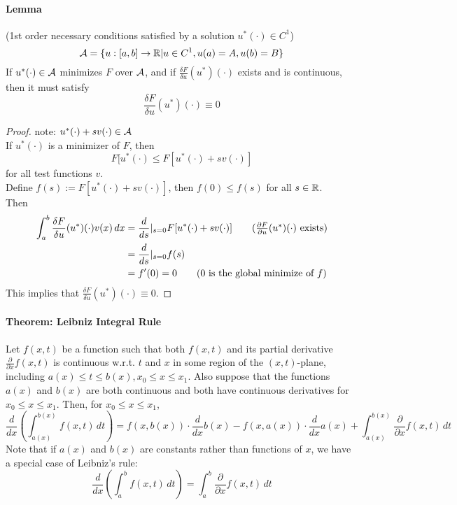 \documentclass[11pt]{article}
\begin{document}
\paragraph{Lemma}(1st order necessary conditions satisfied by a solution $u^*(\cdot) \in C^1$)
$$\mathcal{A} = \{ u: [a,b] \rightarrow \mathbb{R} | u \in C^1, u(a) = A, u(b) = B\}$$
If $u^*(\cdot) \in \mathcal{A}$ minimizes $F$ over $\mathcal{A}$, and if $\frac{\delta F}{\delta u}(u^*)(\cdot)$ exists and is continuous, then it must satisfy
$$\frac{\delta F}{\delta u}(u^*)(\cdot) \equiv 0$$
\begin{proof}
	note: $u^*(\cdot) + sv(\cdot) \in \mathcal{A}$ \\
	If $u^*(\cdot)$ is a minimizer of $F$, then
	$$F[u^*(\cdot) \leq F[u^*(\cdot) + sv(\cdot)]$$
	for all test functions $v$. \\
	Define $f(s) := F[u^*(\cdot) + sv(\cdot)]$, then $f(0) \leq f(s)$ for all $s \in \mathbb{R}$. \\
	Then 
	\begin{align}
		\int_a^b \frac{\delta F}{\delta u}(u^*)(\cdot)v(x) \, dx
		&= \frac{d}{ds}|_{s=0} F[u^*(\cdot) + sv(\cdot)] \tag{$\frac{\partial F}{\partial u}(u^*)(\cdot)$ exists} \\
		&= \frac{d}{ds}|_{s=0} f(s)\\
		&= f'(0) = 0 \tag{0 is the global minimize of $f$}
	\end{align}
	This implies that $\frac{\delta F}{\delta u}(u^*)(\cdot) \equiv 0$.
\end{proof}

\paragraph{Theorem: Leibniz Integral Rule}
Let $f(x,t)$ be a function such that both $f(x,t)$ and its partial derivative  $\frac{\partial}{\partial x} f(x,t)$ is continuous w.r.t. $t$ and $x$ in some region of the $(x,t)$-plane, including $a(x) \leq t \leq b(x), x_0 \leq x \leq x_1$. Also suppose that the functions $a(x)$ and $b(x)$ are both continuous and both have continuous derivatives for $x_0 \leq x \leq x_1$. Then, for $x_0 \leq x \leq x_1$,
$$\frac{d}{dx}\left(\int_{a(x)}^{b(x)} f(x,t) \, dt\right) = f(x, b(x))\cdot \frac{d}{dx} b(x) - f(x, a(x)) \cdot \frac{d}{dx} a(x) + \int_{a(x)}^{b(x)} \frac{\partial}{\partial x} f(x,t) \, dt$$
Note that if $a(x)$ and $b(x)$ are constants rather than functions of $x$, we have a special case of Leibniz's rule:
$$\frac{d}{dx} \left( \int_a^b f(x,t)\, dt\right) = \int_a^b \frac{\partial}{\partial x} f(x,t)\, dt$$
\end{document}
